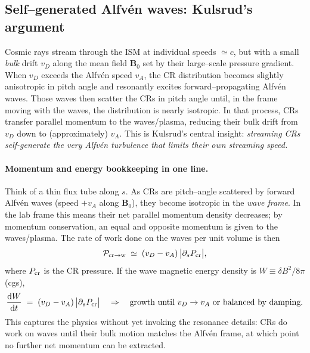 
\subsection{Self–generated Alfv\'en waves: Kulsrud's argument}

Cosmic rays stream through the ISM at individual speeds $\simeq c$, but with a small \emph{bulk} drift $v_D$ along the mean field $\mathbf B_0$ set by their large–scale pressure gradient. When $v_D$ exceeds the Alfv\'en speed $v_A$, the CR distribution becomes slightly anisotropic in pitch angle and resonantly excites forward–propagating Alfv\'en waves. Those waves then scatter the CRs in pitch angle until, in the frame moving with the waves, the distribution is nearly isotropic. In that process, CRs transfer parallel momentum to the waves/plasma, reducing their bulk drift from $v_D$ down to (approximately) $v_A$. This is Kulsrud's central insight: \emph{streaming CRs self-generate the very Alfv\'en turbulence that limits their own streaming speed.}

\paragraph{Momentum and energy bookkeeping in one line.}
Think of a thin flux tube along $s$.
As CRs are pitch–angle scattered by forward Alfv\'en waves (speed $+v_A$ along $\mathbf B_0$), they become isotropic in the \emph{wave frame}. In the lab frame this means their net parallel momentum density decreases; by momentum conservation, an equal and opposite momentum is given to the waves/plasma. The rate of work done on the waves per unit volume is then
\[
\mathcal{P}_{\rm cr\to w}
\;\simeq\;
(v_D - v_A)\,\bigl|\partial_s P_{\rm cr}\bigr| ,
\]
where $P_{\rm cr}$ is the CR pressure. 
If the wave magnetic energy density is $W\equiv \delta B^2/8\pi$ (cgs),
\[
\frac{{\rm d}W}{{\rm d}t} \;=\; (v_D - v_A)\,\bigl|\partial_s P_{\rm cr}\bigr| 
\quad\Rightarrow\quad 
\text{growth until $v_D\to v_A$ or balanced by damping.}
\]
This captures the physics without yet invoking the resonance details: CRs do work on waves until their bulk motion matches the Alfv\'en frame, at which point no further net momentum can be extracted.

